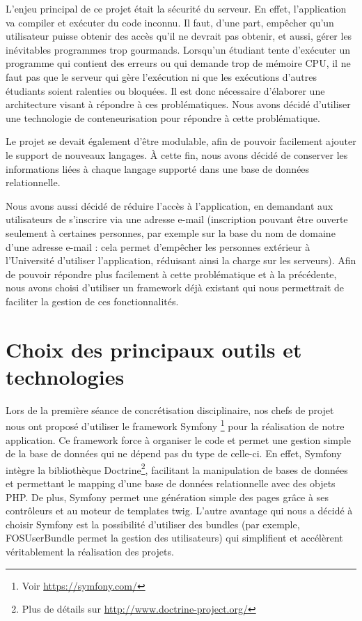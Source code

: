 \par L'enjeu principal de ce projet était la sécurité du serveur. En effet, l'application va compiler et exécuter du code inconnu. Il faut, d'une part, empêcher qu'un utilisateur puisse obtenir des accès qu'il ne devrait pas obtenir, et aussi, gérer les inévitables programmes trop gourmands. Lorsqu'un étudiant tente d'exécuter un programme qui contient des erreurs ou qui demande trop de mémoire CPU, il ne faut pas que le serveur qui gère l'exécution ni que les exécutions d'autres étudiants soient ralenties ou bloquées. Il est donc nécessaire d'élaborer une architecture visant à répondre à ces problématiques. Nous avons décidé d'utiliser une technologie de conteneurisation pour répondre à cette problématique.

\par Le projet se devait également d'être modulable, afin de pouvoir facilement ajouter le support de nouveaux langages. À cette fin, nous avons décidé de conserver les informations liées à chaque langage supporté dans une base de données relationnelle.

\par Nous avons aussi décidé de réduire l'accès à l'application, en demandant aux utilisateurs de s'inscrire via une adresse e-mail (inscription pouvant être ouverte seulement à certaines personnes, par exemple sur la base du nom de domaine d'une adresse e-mail : cela permet d'empêcher les personnes extérieur à l'Université d'utiliser l'application, réduisant ainsi la charge sur les serveurs). Afin de pouvoir répondre plus facilement à cette problématique et à la précédente, nous avons choisi d'utiliser un framework déjà existant qui nous permettrait de faciliter la gestion de ces fonctionnalités.

\section{Choix des principaux outils et technologies}
\label{sec-principaux-outils}
\par Lors de la première séance de concrétisation disciplinaire, nos chefs de projet nous ont proposé d'utiliser le framework Symfony \footnote{Voir \url{https://symfony.com/}} pour la réalisation de notre application. Ce framework force à organiser le code et permet une gestion simple de la base de données qui ne dépend pas du type de celle-ci. En effet, Symfony intègre la bibliothèque Doctrine\footnote{Plus de détails sur \url{http://www.doctrine-project.org/}}, facilitant la manipulation de bases de données et permettant le mapping d'une base de données relationnelle avec des objets PHP. De plus, Symfony permet une génération simple des pages grâce à ses contrôleurs et au moteur de templates twig. L'autre avantage qui nous a décidé à choisir Symfony est la possibilité d'utiliser des bundles (par exemple, FOSUserBundle permet la gestion des utilisateurs) qui simplifient et accélèrent véritablement la réalisation des projets. \\

